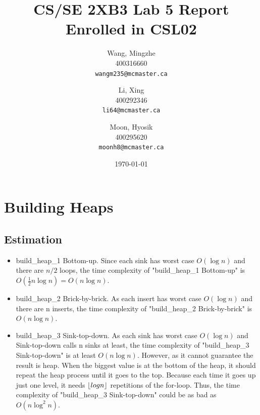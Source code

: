 \documentclass[12pt]{article}
\title{CS/SE 2XB3 Lab 5 Report\\Enrolled in CSL02}
\author{
  Wang, Mingzhe\\400316660\\
  \texttt{wangm235@mcmaster.ca}
  \and
  Li, Xing\\400292346\\
  \texttt{li64@mcmaster.ca}
  \and
  Moon, Hyosik\\400295620\\
  \texttt{moonh8@mcmaster.ca}
  }
\date{\today}
\DeclarePairedDelimiter\floor{\lfloor}{\rfloor}
\begin{document}


\maketitle

\tableofcontents
\newpage

\section{Building Heaps}
\subsection{Estimation}
\begin{itemize}
\item build\_heap\_1 Bottom-up. Since each sink has worst case $O(\log n)$ and there are $n/2$ loops, the time complexity of "build\_heap\_1 Bottom-up" is $O(\frac {1}{2} n \log n) = O(n \log n)$.
\item build\_heap\_2 Brick-by-brick. As each insert has worst case $O(\log n)$ and there are n inserts, the time complexity of "build\_heap\_2 Brick-by-brick" is $O(n \log n)$.

\item build\_heap\_3 Sink-top-down. As each sink has worst case $O(\log n)$ and Sink-top-down calls n sinks at least,  the time complexity of "build\_heap\_3 Sink-top-down" is at least $O(n \log n)$. However, as it cannot guarantee the result is heap. When the biggest value is at the bottom of the heap, it should repeat the heap process until it goes to the top. Because each time it goes up just one level, it needs $\floor{log{n}}$ repetitions of the for-loop. Thus, the time complexity of "build\_heap\_3 Sink-top-down" could be as bad as $O(n \log^2 n)$.
\end{itemize}
\end{document}
